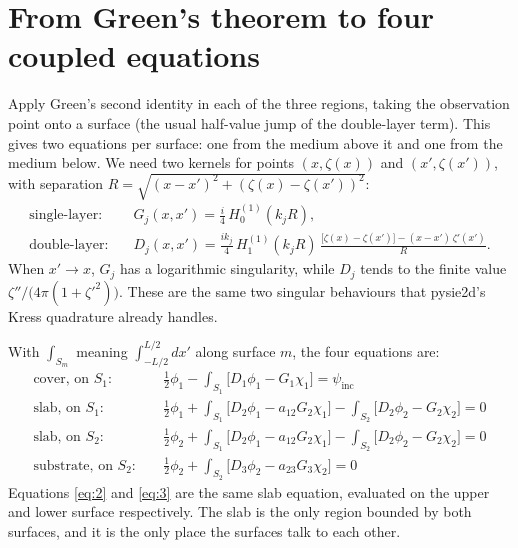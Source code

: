 \documentclass[11pt,a4paper]{article}
\newcommand{\Hz}{H_0^{(1)}}
\newcommand{\Ho}{H_1^{(1)}}
\newcommand{\inc}{\mathrm{inc}}
\begin{document}
\section{From Green's theorem to four coupled equations}

Apply Green's second identity in each of the three regions, taking the observation point onto
a surface (the usual half-value jump of the double-layer term). This gives two
equations per surface: one from the medium above it and one from the medium below. We
need two kernels for points $(x,\zeta(x))$ and $(x',\zeta(x'))$, with separation
$R = \sqrt{(x-x')^2+(\zeta(x)-\zeta(x'))^2}$:
\begin{align}
  \text{single-layer:}\quad & G_j(x,x') = \tfrac{i}{4}\,\Hz(k_jR),\\
  \text{double-layer:}\quad & D_j(x,x') = \tfrac{i k_j}{4}\,\Ho(k_jR)\,
      \frac{\bigl[\zeta(x)-\zeta(x')\bigr] - (x-x')\,\zeta'(x')}{R}.
\end{align}
When $x'\to x$, $G_j$ has a logarithmic singularity, while $D_j$ tends to the finite
value $\zeta''/\bigl(4\pi(1+\zeta'^2)\bigr)$. These are the same two
singular behaviours that pysie2d's Kress quadrature already handles.

With $\int_{S_m}$ meaning $\int_{-L/2}^{L/2}dx'$ along surface $m$, the four equations are:
\begin{align}
\text{cover, on } S_1: \quad
 & \tfrac12\phi_1 - \int_{S_1}\!\bigl[D_1\phi_1 - G_1\chi_1\bigr] = \psi_\inc \label{eq:1}\\
\text{slab, on } S_1: \quad
 & \tfrac12\phi_1 + \int_{S_1}\!\bigl[D_2\phi_1 - a_{12}G_2\chi_1\bigr]
                  - \int_{S_2}\!\bigl[D_2\phi_2 - G_2\chi_2\bigr] = 0 \label{eq:2}\\
\text{slab, on } S_2: \quad
 & \tfrac12\phi_2 + \int_{S_1}\!\bigl[D_2\phi_1 - a_{12}G_2\chi_1\bigr]
                  - \int_{S_2}\!\bigl[D_2\phi_2 - G_2\chi_2\bigr] = 0 \label{eq:3}\\
\text{substrate, on } S_2: \quad
 & \tfrac12\phi_2 + \int_{S_2}\!\bigl[D_3\phi_2 - a_{23}G_3\chi_2\bigr] = 0 \label{eq:4}
\end{align}
Equations \eqref{eq:2} and \eqref{eq:3} are the same slab equation, evaluated on
the upper and lower surface respectively. The slab is the only region bounded by
both surfaces, and it is the only place the surfaces talk to each other.
\end{document}
